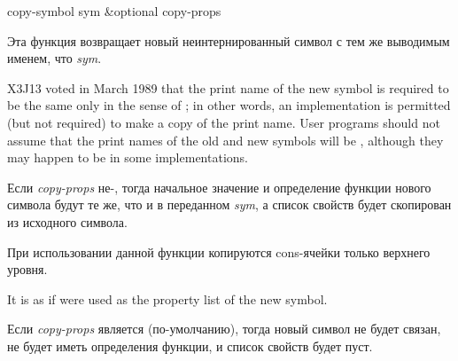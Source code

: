 \begin{defun}[Функция]
copy-symbol sym &optional copy-props

Эта функция возвращает новый неинтернированный символ с тем же выводимым именем,
что \emph{sym}.

\begin{newer}
X3J13 voted in March 1989 
that the print name of the new symbol is required to be
the same only in the sense of ; in other words,
an implementation is permitted (but not required)
to make a copy of the print name.
User programs should not assume that the print names of the old and new symbols
will be , although they may happen to be  in some implementations.
\end{newer}

Если \emph{copy-props} не-{\nil}, тогда начальное значение и определение функции
нового символа будут те же, что и в переданном \emph{sym}, а список свойств будет
скопирован из исходного символа.

При использовании данной функции копируются cons-ячейки только верхнего уровня.
\begin{newer}
It is as if 
were used as the property list of the new symbol.
\end{newer}

Если \emph{copy-props} является {\nil} (по-умолчанию), тогда новый символ не
будет связан, не будет иметь определения функции, и список свойств будет пуст.
\end{defun}

